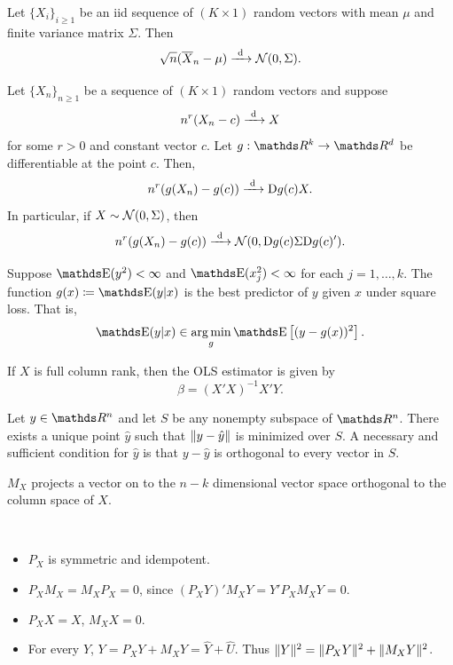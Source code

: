 \begin{theorem}
  Let \(\{X_i\}_{i \geq 1}\) be an iid sequence of \((K \times 1)\) random vectors with mean \(\mu\) and finite variance matrix \(\Sigma\).
  Then
  \[
    \sqrt{n} (\overline{X}_n - \mu) \xrightarrow{\ \mathrm{d}\ } \mathcal{N}(0, \Sigma).
  \]
\end{theorem}

\begin{theorem}
  Let \(\{X_n\}_{n \geq 1}\) be a sequence of \((K \times 1)\) random vectors and suppose
  \[
    n^r (X_n - c) \xrightarrow{\ \mathrm{d}\ } X
  \]
  for some \(r > 0\) and constant vector \(c\).
  Let \(g: \RR^k \to \RR^d\) be differentiable at the point \(c\).
  Then,
  \[
    n^r (g(X_n) - g(c)) \xrightarrow{\ \mathrm{d}\ } \mathrm{D} g(c) X.
  \]
  In particular, if \(X \sim \mathcal{N}(0, \Sigma)\), then
  \[
    n^r (g(X_n) - g(c)) \xrightarrow{\ \mathrm{d}\ } \mathcal{N}(0, \mathrm{D} g(c) \Sigma \mathrm{D} g(c)').
  \]
\end{theorem}

\begin{theorem}
  Suppose \(\E(y^2) < \infty\) and \(\E(x_j^2) < \infty\) for each \(j = 1, \dots, k\).
  The function \(g(x) \coloneqq \E(y|x)\) is the best predictor of \(y\) given \(x\) under square loss.
  That is,
  \[
    \E(y|x) \in \argmin_{g} \E\left[ (y - g(x))^2 \right] .
  \]
\end{theorem}

\begin{proposition}
  If \(X\) is full column rank, then the OLS estimator is given by
  \[
    \hat{\beta} = (X'X)^{-1} X'Y.
  \]
\end{proposition}

\begin{theorem}
  Let \(y \in \RR^n\) and let \(S\) be any nonempty subspace of \(\RR^n\).
  There exists a unique point \(\hat{y}\) such that \(\lVert y - \hat{y}\rVert\) is minimized over \(S\).
  A necessary and sufficient condition for \(\hat{y}\) is that \(y - \hat{y}\) is orthogonal to every vector in \(S\).
\end{theorem}

\begin{proposition}
  \(M_X\) projects a vector on to the \(n - k\) dimensional vector space orthogonal to the column space of \(X\).
\end{proposition}

\begin{proposition}~
  \begin{itemize}
    \item \(P_X\) is symmetric and idempotent.
    \item \(P_X M_X = M_X P_X = 0\), since \((P_X Y)' M_X Y = Y' P_X M_X Y = 0\).
    \item \(P_X X = X\), \(M_X X = 0\). 
    \item For every \(Y\), \(Y = P_X Y + M_X Y = \hat{Y} + \hat{U}\).
      Thus \(\lVert Y\rVert^2 = \lVert P_X Y\rVert^2 + \lVert M_X Y\rVert^2\).
  \end{itemize}
\end{proposition}

